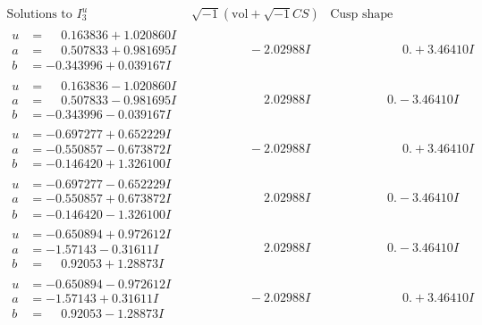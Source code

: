 \documentclass[1p]{elsarticle_modified}
\theoremstyle{definition}
\newcommand{\I}{\sqrt{-1}}
\begin{document}
$$\begin{array}{c|c|c}  
\text{Solutions to }I^u_{3}& \I (\text{vol} + \sqrt{-1}CS) & \text{Cusp shape}\\
 \hline 
\begin{aligned}
u &= \phantom{-}0.163836 + 1.020860 I \\
a &= \phantom{-}0.507833 + 0.981695 I \\
b &= -0.343996 + 0.039167 I\end{aligned}
 & \phantom{-0.000000 } -2.02988 I & \phantom{-0.000000 -}0. + 3.46410 I \\ \hline\begin{aligned}
u &= \phantom{-}0.163836 - 1.020860 I \\
a &= \phantom{-}0.507833 - 0.981695 I \\
b &= -0.343996 - 0.039167 I\end{aligned}
 & \phantom{-0.000000 -}2.02988 I & \phantom{-0.000000 } 0. - 3.46410 I \\ \hline\begin{aligned}
u &= -0.697277 + 0.652229 I \\
a &= -0.550857 - 0.673872 I \\
b &= -0.146420 + 1.326100 I\end{aligned}
 & \phantom{-0.000000 } -2.02988 I & \phantom{-0.000000 -}0. + 3.46410 I \\ \hline\begin{aligned}
u &= -0.697277 - 0.652229 I \\
a &= -0.550857 + 0.673872 I \\
b &= -0.146420 - 1.326100 I\end{aligned}
 & \phantom{-0.000000 -}2.02988 I & \phantom{-0.000000 } 0. - 3.46410 I \\ \hline\begin{aligned}
u &= -0.650894 + 0.972612 I \\
a &= -1.57143 - 0.31611 I \\
b &= \phantom{-}0.92053 + 1.28873 I\end{aligned}
 & \phantom{-0.000000 -}2.02988 I & \phantom{-0.000000 } 0. - 3.46410 I \\ \hline\begin{aligned}
u &= -0.650894 - 0.972612 I \\
a &= -1.57143 + 0.31611 I \\
b &= \phantom{-}0.92053 - 1.28873 I\end{aligned}
 & \phantom{-0.000000 } -2.02988 I & \phantom{-0.000000 -}0. + 3.46410 I \\ \hline\begin{aligned}

\end{aligned}
\end{array}$$
\end{document}
